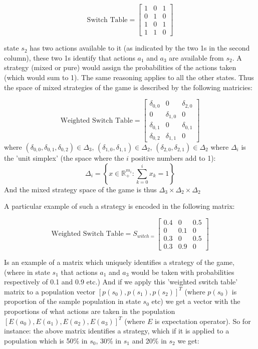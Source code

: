 \documentclass[journal,article,accept,oneauthors,pdftex,10pt,a4paper]{mdpi}
\begin{document}
$$ \text{Switch Table}= \begin{bmatrix}
    1&0&1 \\
    0&1&0 \\
    1&0&1 \\
    1&1&0
\end{bmatrix} $$

state $s_2$ has two actions available to it (as indicated by the two 1s in the second column), these two 1s identify that actions $a_1$ and $a_3$ are available from $s_2$.
A strategy (mixed or pure) would assign the probabilities of the actions taken (which would sum to 1). The same reasoning applies to all the other states.
Thus the space of mixed strategies of the game is described by the following matricies:

$$ \text{Weighted Switch Table}= \begin{bmatrix}
    \delta_{0,0}&0&\delta_{2,0} \\
    0&\delta_{1,0}&0 \\
    \delta_{0,1}&0&\delta_{0,1} \\
    \delta_{0,2}&\delta_{1,1}&0
\end{bmatrix} $$
where $(\delta_{0,0},\delta_{0,1},\delta_{0,2}) \in \Delta_3$, $(\delta_{1,0},\delta_{1,1})\in\Delta_2$, $(\delta_{2,0},\delta_{2,1})\in\Delta_2$ where $\Delta_i$ is the 'unit simplex' (the space where the $i$ positive numbers add to 1):
$$ \Delta_i=\left\{x\in\mathbb{R}^{m_i}_+:\sum_{k=0}^ix_k=1\right\} $$
And the mixed strategy space of the game is thus $\Delta_3\times\Delta_2\times\Delta_2$

A particular example of such a strategy is encoded in the following matrix:

$$ \text{Weighted Switch Table}=S_{witch=} \begin{bmatrix}
    0.4&0&0.5 \\
    0&0.1&0 \\
    0.3&0&0.5 \\
    0.3&0.9&0
\end{bmatrix} $$

Is an example of a matrix which uniquely identifies a strategy of the game, (where in state $s_1$ that actions $a_1$ and $a_3$ would be taken with probabilities respectively of 0.1 and 0.9 etc.)
And if we apply this 'weighted switch table' matrix to a population vector $[p(s_0),p(s_1),p(s_2)]^T$ (where $p(s_0)$ is proportion of the sample population in state $s_0$ etc) we get a vector with the proportions of what actions are taken in the population $[E(a_0),E(a_1),E(a_2),E(a_3)]^T$ (where $E$ is expectation operator).
So for instance: the above matrix identifies a strategy, which if it is applied to a population which is 50\% in $s_0$, 30\% in $s_1$ and 20\% in $s_2$ we get:
\end{document}

